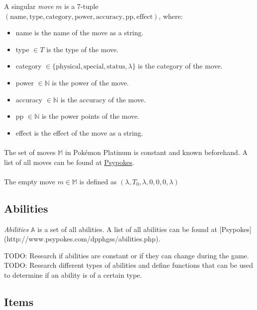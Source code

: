 A singular \emph{move} $m$ is a 7-tuple $(\text{name}, \text{type}, \text{category}, \text{power}, \text{accuracy}, \text{pp}, \text{effect})$, where:
\begin{itemize}
    \item name is the name of the move as a string.
    \item type $\in T$ is the type of the move.
    \item category $\in \{ \text{physical}, \text{special}, \text{status}, \lambda \}$ is the category of the move.
    \item power $\in \mathbb{N}$ is the power of the move.
    \item accuracy $\in \mathbb{N}$ is the accuracy of the move.
    \item pp $\in \mathbb{N}$ is the power points of the move.
    \item effect is the effect of the move as a string.
\end{itemize}

\paragraph{}
The set of moves $\mathbb{M}$ in Pokémon Platinum is constant and known beforehand. A list of all moves can be found at \href{http://www.psypokes.com/dpphgss/attacks.php}{Psypokes}.

\paragraph{}
The empty move $m \in \mathbb{M}$ is defined as $(\lambda, T_0, \lambda, 0, 0, 0, \lambda)$

\subsection{Abilities}

\emph{Abilities} $\mathbb{A}$ is a set of all abilities. A list of all abilities can be found at [Psypokes](http://www.psypokes.com/dpphgss/abilities.php).

TODO: Research if abilities are constant or if they can change during the game.  
TODO: Research different types of abilities and define functions that can be used to determine if an ability is of a certain type.

\subsection{Items}

